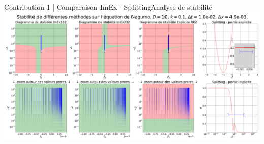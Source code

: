 \begin{frame}{Contribution 1 | Comparaison ImEx - Splitting}{Analyse de stabilité}
    \includegraphics[width = \textwidth]{medias/2_/1_/STABILITE_D10_k0.1_dt1.0e-02_dx4.9e-03.png}
\end{frame}